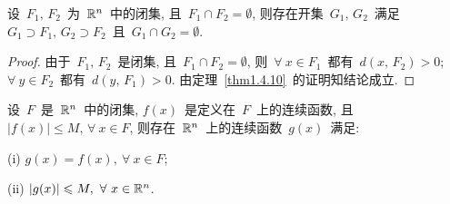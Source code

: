 \begin{theorem} \label{thm1413}
设~$F_1,\,F_2$~为~$\mathbb{R}^n$~中的闭集, 且~$F_1 \cap F_2 = \emptyset$, 则存在开集~$G_1,\,G_2$~满足~$G_1 \supset F_1,\,G_2 \supset F_2$~且~$G_1 \cap G_2 = \emptyset$.
\end{theorem}

\begin{proof}
由于~$F_1,\,F_2$~是闭集, 且~$F_1 \cap F_2 = \emptyset$, 则~$\forall~x \in F_1$~都有~$d(x,\,F_2) > 0$; ~$\forall~y \in F_2$~都有~$d(y,\,F_1) > 0$. 由定理~\ref{thm1.4.10}~的证明知结论成立.
\end{proof}

\begin{theorem} \label{thm1414}
设~$F$~是~$\mathbb{R}^n$~中的闭集, $f(x)$~是定义在~$F$~上的连续函数, 且~$|f(x)| \leqslant M, \, \forall~x \in F$, 则存在~$\mathbb{R}^n$~上的连续函数~$g(x)$~满足:

(i) $g(x) = f(x), ~ \forall~x \in F$;

(ii) $|g(x)| \leqslant M, ~ \forall~x \in \mathbb{R}^n$.
\end{theorem}

